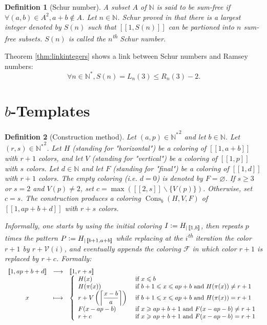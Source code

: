 \documentclass{article}
\newtheorem{definition}{Definition}[section]
\DeclareMathOperator{\cons}{Cons}
\newcommand{\defeq}{\vcentcolon=}
\begin{document}
\begin{definition}[Schur number]
A subset \(A\) of \(\mathbb{N}\) is said to be sum-free if \(\forall (a, b) \in A^2, a + b \notin A\). Let 
\(n \in \mathbb{N}\). Schur proved in \cite{Schur1917} that there is a largest integer denoted by \(S(n)\) such that 
\([\![1, S(n)]\!]\) can be partioned into \(n\) sum-free subsets. \(S(n)\) is called the \(n\)\textsuperscript{th} 
Schur number.
\end{definition}

Theorem \ref{thm:linkintegers} shows a link between Schur numbers and Ramsey numbers:
\[\forall n \in \mathbb{N}^*, S(n) = L_n(3) \leqslant R_n(3) - 2.\]

\section{\(b\)-Templates}
\label{sec:temp}

\begin{definition}[Construction method]
Let \((a, p) \in {\mathbb{N}^*}^2\) and let \(b \in \mathbb{N}\). Let \((r, s) \in {\mathbb{N}^*}^2\). Let \(H\) 
(standing for "horizontal") be a coloring of \([\![1, a + b]\!]\) with \(r + 1\) colors, and let \(V\)  (standing for 
"vertical") be a coloring of \([\![1, p]\!]\) with \(s\) colors. Let \(d \in \mathbb{N}\) and let \(F\) (standing for 
"final") be a coloring of \([\![1, d]\!]\) with \(r + 1\) colors. The empty coloring (i.e. \(d = 0\)) is denoted by 
\(F = \varnothing\). If \(s \geqslant 3\) or \(s = 2\) and \(V(p) \neq 2\), set \(c = \max ([\![2, s]\!] \backslash 
\{V(p)\})\). Otherwise, set \(c = s\). The construction produces a coloring \(\cons_b(H, V, F)\) of 
\([\![1, a p + b + d]\!]\) with \(r + s\) colors.

Informally, one starts by using the initial coloring \(I \defeq H_{| \, [\![1, b]\!]}\), then repeats \(p\) times the 
pattern \(P \defeq H_{| \, [\![b + 1, a + b]\!]}\) while replacing at the \(i\)\textsuperscript{th} iteration the color 
\(r + 1\) by \(r + \mathcal{V}(i)\), and eventually appends the coloring \(\mathcal{F}\) in which color \(r + 1\) is 
replaced by \(r + c\). Formally:
\[\begin{array}{ccl}
	[\![1, a p + b + d]\!]  & \longrightarrow &  [\![1, r + s]\!] \\
 	x & \longmapsto & 
		\left\{\begin{array}{l l}
			H(x) & ~\text{if}~ x \leqslant b \\
			H(\pi(x)) & ~\text{if}~  b + 1 \leqslant x \leqslant a p + b ~\text{and}~ H(\pi(x)) \neq r + 1 \\
			r + V \left(\left\lceil \dfrac{x - b}{a} \right\rceil\right) & ~\text{if}~ b + 1 \leqslant x \leqslant a p + b 
				~\text{and}~ H(\pi(x)) = r + 1 \\
			F(x - a p - b) & ~\text{if}~ x \geqslant a p + b + 1 ~\text{and}~ F(x - a p - b) \neq r + 1 \\
			r + c & ~\text{if}~ x \geqslant a p + b + 1 ~\text{and}~ F(x - a p - b) = r + 1 \\
		\end{array}\right.
\end{array}\]
\end{definition}
\end{document}
